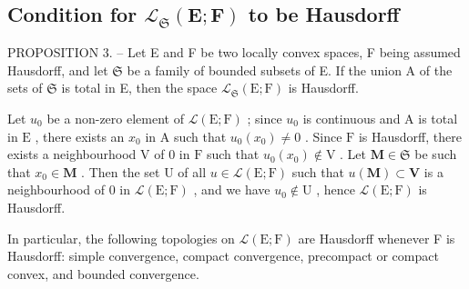 \subsection{\texorpdfstring{Condition for \(\mathcal{L}_{\mathfrak{S}}(\mathbf{E};\mathbf{F})\) to be Hausdorff}{Condition for \textbackslash mathcal\{L\}\_\{\textbackslash mathfrak\{S\}\}(\textbackslash mathbf\{E\};\textbackslash mathbf\{F\}) to be Hausdorff}}

PROPOSITION 3. -- Let E and F be two locally convex spaces, F being assumed Hausdorff, and let \(\mathfrak{S}\) be a family of bounded subsets of E. If the union A of the sets of \(\mathfrak{S}\) is total in E, then the space \(\mathcal{L}_{\mathfrak{S}}(\mathrm{E};\mathrm{F})\) is Hausdorff.

Let \(u_0\) be a non-zero element of \(\mathcal{L}(\mathrm{E};\mathrm{F})\) ; since \(u_0\) is continuous and \(\mathrm{A}\) is total in \(\mathrm{E}\) , there exists an \(x_0\) in \(\mathrm{A}\) such that \(u_0(x_0) \neq 0\) . Since \(\mathrm{F}\) is Hausdorff, there exists a neighbourhood \(\mathrm{V}\) of 0 in \(\mathrm{F}\) such that \(u_0(x_0) \notin \mathrm{V}\) . Let \(\mathbf{M} \in \mathfrak{S}\) be such that \(x_0 \in \mathbf{M}\) . Then the set \(\mathrm{U}\) of all \(u \in \mathcal{L}(\mathrm{E};\mathrm{F})\) such that \(u(\mathbf{M}) \subset \mathbf{V}\) is a neighbourhood of 0 in \(\mathcal{L}(\mathrm{E};\mathrm{F})\) , and we have \(u_0 \notin \mathrm{U}\) , hence \(\mathcal{L}(\mathrm{E};\mathrm{F})\) is Hausdorff.

In particular, the following topologies on \(\mathcal{L}(\mathrm{E};\mathrm{F})\) are Hausdorff whenever F is Hausdorff: simple convergence, compact convergence, precompact or compact convex, and bounded convergence.

